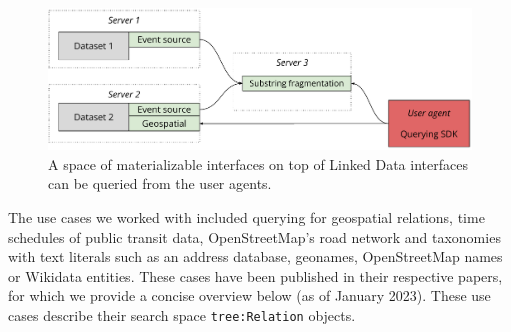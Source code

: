\documentclass[
]{ceurart}
\begin{document}
\begin{figure}
  \centering
  \includegraphics[width=\linewidth]{multiple-views2}
  \caption{A space of materializable interfaces on top of Linked Data interfaces can be queried from the user agents.}
  \label{multiple-views-2}
\end{figure}

The use cases we worked with included querying for geospatial relations, time schedules of public transit data, OpenStreetMap’s road network and taxonomies with text literals such as an address database, geonames, OpenStreetMap names or Wikidata entities.
These cases have been published in their respective papers, for which we provide a concise overview below (as of January 2023).
These use cases describe their search space \texttt{tree:Relation} objects.
\end{document}
